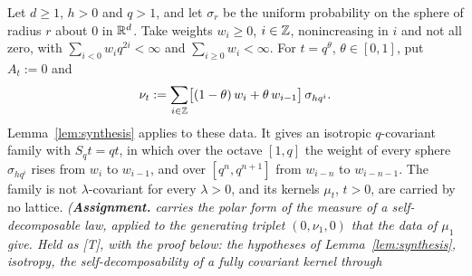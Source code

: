 \begin{proposition}
\label{prop:stratum-two-example}
\leanok
Let $d \ge 1$, $h > 0$ and $q > 1$, and let $\sigma_r$ be the uniform probability on the sphere of
radius $r$ about $0$ in $\mathbb{R}^d$. Take weights $w_i \ge 0$, $i \in \mathbb{Z}$, nonincreasing in $i$ and not
all zero, with $\sum_{i<0}w_iq^{2i} < \infty$ and $\sum_{i \ge 0}w_i < \infty$. For $t = q^\theta$, $\theta \in [0, 1]$, put
$A_t := 0$ and
\[
  \nu_t := \sum_{i \in \mathbb{Z}}\bigl[(1 - \theta)\,w_i + \theta\,w_{i-1}\bigr]\,\sigma_{hq^i}.
\]
Lemma~\ref{lem:synthesis} applies to these data. It gives an isotropic $q$-covariant family with
$S_qt = qt$, in which over the octave $[1, q]$ the weight of every sphere $\sigma_{hq^i}$ rises from
$w_i$ to $w_{i-1}$, and over $[q^n, q^{n+1}]$ from $w_{i-n}$ to $w_{i-n-1}$. The family is not
$\lambda$-covariant for every $\lambda > 0$, and its kernels $\mu_t$, $t > 0$, are carried by no
lattice.
\statusA\quad{}\quad\emph{(\textbf{Assignment.}  carries the polar form of the
\Levy{} measure of a self-decomposable law, applied to the generating triplet $(0, \nu_1, 0)$ that
the data of $\mu_1$ give. Held as [T], with the proof below: the hypotheses of
Lemma~\ref{lem:synthesis}, isotropy, the self-decomposability of a fully covariant kernel through
}
\end{proposition}
